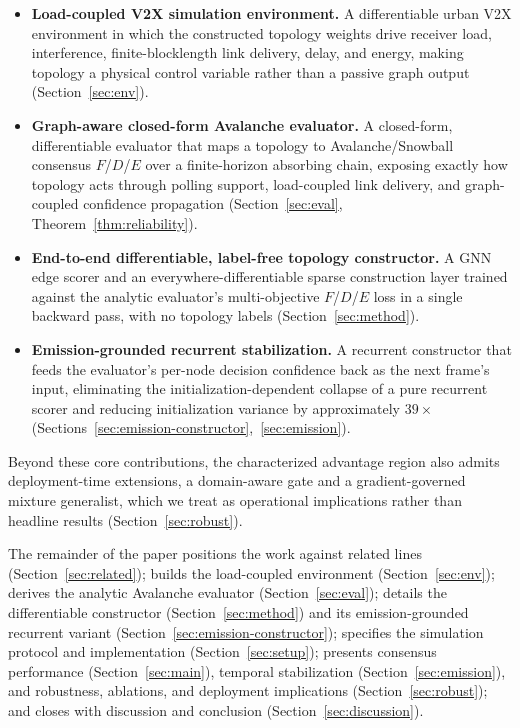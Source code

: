 \documentclass[journal]{IEEEtran}
\begin{document}
\begin{itemize}
\item \textbf{Load-coupled V2X simulation environment.} A differentiable
urban V2X environment in which the constructed topology weights drive receiver
load, interference, finite-blocklength link delivery, delay, and energy, making
topology a physical control variable rather than a passive graph output
(Section~\ref{sec:env}).

\item \textbf{Graph-aware closed-form Avalanche evaluator.} A closed-form,
differentiable evaluator that maps a topology to Avalanche/Snowball consensus
$F$/$D$/$E$ over a finite-horizon absorbing chain, exposing exactly how topology
acts through polling support, load-coupled link delivery, and graph-coupled
confidence propagation (Section~\ref{sec:eval}, Theorem~\ref{thm:reliability}).

\item \textbf{End-to-end differentiable, label-free topology constructor.} A
GNN edge scorer and an everywhere-differentiable sparse construction layer
trained against the analytic evaluator's multi-objective $F$/$D$/$E$ loss in a
single backward pass, with no topology labels (Section~\ref{sec:method}).

\item \textbf{Emission-grounded recurrent stabilization.} A recurrent
constructor that feeds the evaluator's per-node decision confidence back as the
next frame's input, eliminating the initialization-dependent collapse of a pure
recurrent scorer and reducing initialization variance by approximately $39\times$
(Sections~\ref{sec:emission-constructor},~\ref{sec:emission}).
\end{itemize}

Beyond these core contributions, the characterized advantage region also admits
deployment-time extensions, a domain-aware gate and a gradient-governed mixture
generalist, which we treat as operational implications rather than headline
results (Section~\ref{sec:robust}).

The remainder of the paper positions the work against related lines
(Section~\ref{sec:related}); builds the load-coupled environment
(Section~\ref{sec:env}); derives the analytic Avalanche evaluator
(Section~\ref{sec:eval}); details the differentiable constructor
(Section~\ref{sec:method}) and its emission-grounded recurrent variant
(Section~\ref{sec:emission-constructor}); specifies the simulation protocol and
implementation (Section~\ref{sec:setup}); presents consensus performance
(Section~\ref{sec:main}), temporal stabilization (Section~\ref{sec:emission}),
and robustness, ablations, and deployment implications
(Section~\ref{sec:robust}); and closes with discussion and conclusion
(Section~\ref{sec:discussion}).
\end{document}
